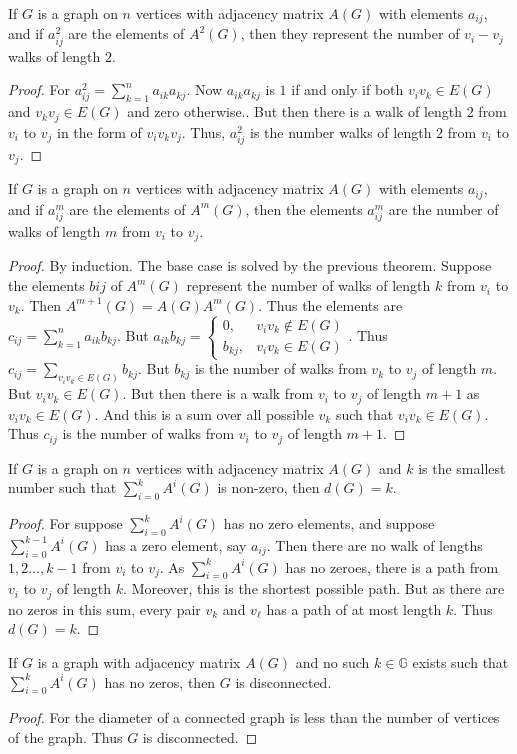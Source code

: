 \documentclass[crop=false,class=book,oneside]{standalone}
\begin{document}
\begin{theorem}
If $G$ is a graph on $n$ vertices with adjacency matrix $A(G)$ with elements $a_{ij}$, and if $a^2_{ij}$ are the elements of $A^2(G)$, then they represent the number of $v_{i}-v_{j}$ walks of length $2$.
\end{theorem}
\begin{proof}
For $a^2_{ij} = \sum_{k=1}^{n} a_{ik}a_{kj}$. Now $a_{ik}a_{kj}$ is $1$ if and only if both $v_iv_k \in E(G)$ and $v_kv_j \in E(G)$ and zero otherwise.. But then there is a walk of length $2$ from $v_i$ to $v_j$ in the form of $v_i v_k v_j$. Thus, $a^2_{ij}$ is the number walks of length $2$ from $v_i$ to $v_j$.
\end{proof} 
\begin{theorem}
If $G$ is a graph on $n$ vertices with adjacency matrix $A(G)$ with elements $a_{ij}$, and if $a^m_{ij}$ are the elements of $A^m(G)$, then the elements $a^m_{ij}$ are the number of walks of length $m$ from $v_i$ to $v_j$.
\end{theorem}
\begin{proof}
By induction. The base case is solved by the previous theorem. Suppose the elements $b{ij}$ of $A^m(G)$ represent the number of walks of length $k$ from $v_i$ to $v_k$. Then $A^{m+1}(G)=A(G)A^m(G)$. Thus the elements are $c_{ij} = \sum_{k=1}^{n} a_{ik}b_{kj}$. But $a_{ik}b_{kj} = \begin{cases} 0, & v_i v_k \notin E(G) \\ b_{kj}, & v_i v_k \in E(G)\end{cases}$. Thus $c_{ij} = \underset{v_i v_k \in E(G)}\sum b_{kj}$. But $b_{kj}$ is the number of walks from $v_k$ to $v_j$ of length $m$. But $v_i v_k \in E(G)$. But then there is a walk from $v_i$ to $v_j$ of length $m+1$ as $v_iv_k \in E(G)$. And this is a sum over all possible $v_k$ such that $v_iv_k \in E(G)$. Thus $c_{ij}$ is the number of walks from $v_i$ to $v_j$ of length $m+1$.
\end{proof}
\begin{theorem}
If $G$ is a graph on $n$ vertices with adjacency matrix $A(G)$ and $k$ is the smallest number such that $\sum_{i=0}^{k} A^i(G)$ is non-zero, then $d(G) = k$.
\end{theorem}
\begin{proof}
For suppose $\sum_{i=0}^{k}A^i(G)$ has no zero elements, and suppose $\sum_{i=0}^{k-1}A^i(G)$ has a zero element, say $a_{ij}$. Then there are no walk of lengths $1,2 \hdots, k-1$ from $v_i$ to $v_j$. As $\sum_{i=0}^{k} A^i(G)$ has no zeroes, there is a path from $v_{i}$ to $v_{j}$ of length $k$. Moreover, this is the shortest possible path. But as there are no zeros in this sum, every pair $v_k$ and $v_{\ell}$ has a path of at most length $k$. Thus $d(G)=k$.
\end{proof}
\begin{theorem}
If $G$ is a graph with adjacency matrix $A(G)$ and no such $k\in \mathbb{G}$ exists such that $\sum_{i=0}^{k}A^i(G)$ has no zeros, then $G$ is disconnected.
\end{theorem}
\begin{proof}
For the diameter of a connected graph is less than the number of vertices of the graph. Thus $G$ is disconnected.
\end{proof}
\end{document}
